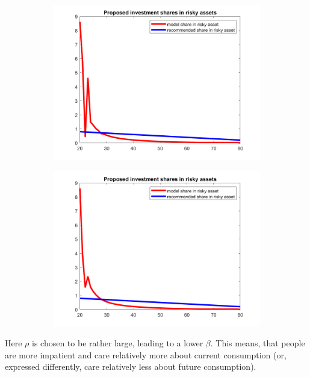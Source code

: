 \documentclass[12pt,a4paper]{article}
\begin{document}
\begin{figure}[h!]
  \centering
  \begin{subfigure}[b]{0.49\linewidth}
    \includegraphics[width=\linewidth]{graphs/sharesriskyasset.png}
  \end{subfigure}
  \begin{subfigure}[b]{0.49\linewidth}
      \includegraphics[width=\linewidth]{graphs/sharesriskyassetns100000.png}
  \end{subfigure}
  \label{fig:5}
\end{figure}

Here $\rho$ is chosen to be rather large, leading to a lower $\beta$. This means, that people are more impatient and care relatively more about current consumption (or, expressed differently, care relatively less about future consumption).
\end{document}

